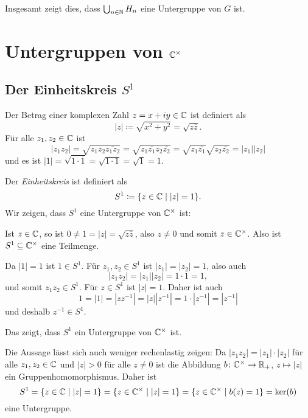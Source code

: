 Insgesamt zeigt dies, dass $\bigcup_{n \in \mathbb{N}} H_n$ eine Untergruppe von $G$ ist.





\section{Untergruppen von \texorpdfstring{$\mathbb{C}^\times$}{Cx}}



\subsection{Der Einheitskreis \texorpdfstring{$S^1$}{S1}}
Der Betrag einer komplexen Zahl $z = x+iy \in \mathbb{C}$ ist definiert als
\[
 |z| \coloneqq \sqrt{x^2+y^2} = \sqrt{z \overline{z}}.
\]
Für alle $z_1, z_2 \in \mathbb{C}$ ist
\[
 |z_1 z_2|
 = \sqrt{z_1 z_2 \overline{z_1 z_2}}
 = \sqrt{z_1 \overline{z_1} z_2 \overline{z_2}}
 = \sqrt{z_1 \overline{z_1}} \sqrt{z_2 \overline{z_2}}
 = |z_1| |z_2|
\]
und es ist $|1| = \sqrt{1 \cdot \overline{1}} = \sqrt{1 \cdot 1} = \sqrt{1} = 1$.

Der \emph{Einheitskreis} ist definiert als
\[
 S^1 \coloneqq \{z \in \mathbb{C} \mid |z| = 1\}.
\]
Wir zeigen, dass $S^1$ eine Untergruppe von $\mathbb{C}^\times$ ist:

Ist $z \in \mathbb{C}$, so ist $0 \neq 1 = |z| = \sqrt{z \overline{z}}$, also $z \neq 0$ und somit $z \in \mathbb{C}^\times$. Also ist $S^1 \subseteq \mathbb{C}^\times$ eine Teilmenge.

Da $|1| = 1$ ist $1 \in S^1$. Für $z_1, z_2 \in S^1$ ist $|z_1| = |z_2| = 1$, also auch
\[
 |z_1 z_2| = |z_1| |z_2| = 1 \cdot 1 = 1,
\]
und somit $z_1 z_2 \in S^1$. Für $z \in S^1$ ist $|z|= 1$. Daher ist auch
\[
 1 = |1| = |z z^{-1}| = |z| |z^{-1}| = 1 \cdot |z^{-1}| = |z^{-1}|
\]
und deshalb $z^{-1} \in S^1$.

Das zeigt, dass $S^1$ ein Untergruppe von $\mathbb{C}^\times$ ist.


\begin{bem}
 Die Aussage lässt sich auch weniger rechenlastig zeigen: Da $|z_1 z_2| = |z_1| \cdot |z_2|$ für alle $z_1, z_2 \in \mathbb{C}$ und $|z| > 0$ für alle $z \neq 0$ ist die Abbildung $b \colon \mathbb{C}^\times \to \mathbb{R}_+$, $z \mapsto |z|$ ein Gruppenhomomorphismus. Daher ist
 \[
  S^1
  = \{z \in \mathbb{C} \mid |z| = 1\}
  = \{z \in \mathbb{C}^\times \mid |z| = 1\}
  = \{z \in \mathbb{C}^\times \mid b(z) = 1\}
  = \ker(b)
 \]
 eine Untergruppe.
\end{bem}



